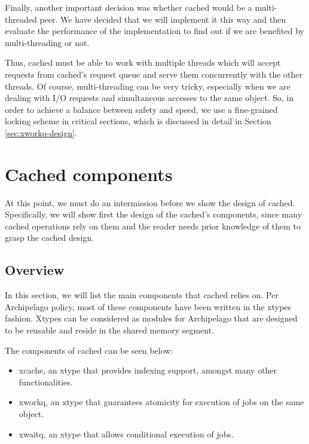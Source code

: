 Finally, another important decision was whether cached would be a 
multi-threaded peer. We have decided that we will implement it this way and 
then evaluate the performance of the implementation to find out if we are 
benefited by multi-threading or not.

Thus, cached must be able to work with multiple threads which will accept 
requests from cached's request queue and serve them concurrently with the other 
threads. Of course, multi-threading can be very tricky, especially when we are 
dealing with I/O requests and simultaneous accesses to the same object.  So, in 
order to achieve a balance between safety and speed, we use a
fine-grained locking scheme in critical sections, which is discussed in detail 
in Section \ref{sec:xworkq-design}.

\section{Cached components}\label{sec:comp-design}

At this point, we must do an intermission before we show the design of cached.  
Specifically, we will show first the design of the cached's components, since 
many cached operations rely on them and the reader needs prior knowledge of 
them to grasp the cached design.

\subsection{Overview}

In this section, we will list the main components that cached relies on. Per 
Archipelago policy, most of these components have been written in the xtypes 
fashion. Xtypes can be considered as modules for Archipelago that are designed 
to be reusable and reside in the shared memory segment.

The components of cached can be seen below:
 
\begin{itemize}
	\item xcache, an xtype that provides indexing support, amongst many other 
		functionalities.
	\item xworkq, an xtype that guarantees atomicity for execution of jobs on 
		the same object.
	\item xwaitq, an xtype that allows conditional execution of jobs.
\end{itemize}

